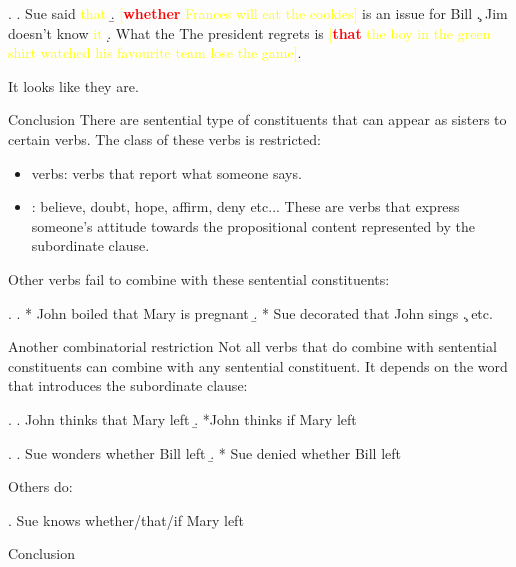 {\begin{frame}
\end{frame}

\begin{frame}

\ex.
\a. Sue said \textcolor{yellow}{that}
\b. \textcolor{yellow}{[\textcolor{red}{\textbf{whether}} Frances will eat the cookies]} is an issue for Bill
\c. Jim doesn't know \textcolor{yellow}{it}
\d. What the The president regrets is \textcolor{yellow}{[\textcolor{red}{\textbf{that}} the boy in the green shirt watched his favourite team lose the game]}.
  
\pause

It looks like they are. 
\end{frame}

\begin{frame}
  {Conclusion}
There are sentential type of constituents that can appear as sisters to certain verbs.
The class of these verbs is restricted:
\begin{itemize}
\item {} verbs: verbs that report what someone says.
\item {}: believe, doubt, hope, affirm, deny etc... These are verbs that express someone's attitude towards the propositional content represented by the subordinate clause. 
\end{itemize}

Other verbs fail to combine with these sentential constituents:

\ex.  
\a. * John boiled that Mary is pregnant
\b. * Sue decorated that John sings
\c.  etc.  


\end{frame}
\begin{frame}
  {Another combinatorial restriction}
Not all verbs that do combine with sentential constituents can combine with any sentential constituent.  It depends on the word that introduces the subordinate clause:

\ex.
\a. John thinks that Mary left
\b. *John thinks if Mary left

\ex.  
\a. Sue wonders whether Bill left
\b. * Sue denied whether Bill left 

Others do:

\ex.
Sue knows whether/that/if Mary left

\end{frame}

\begin{frame}
  {Conclusion}


\end{frame}}
